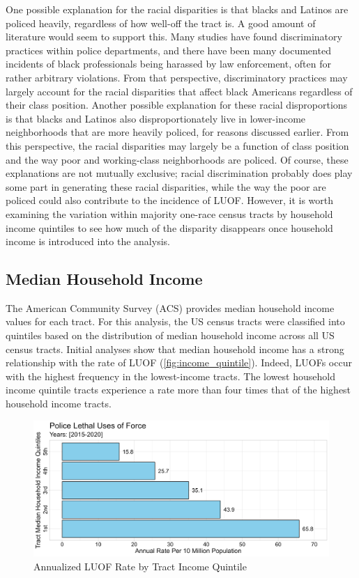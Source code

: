\documentclass[12pt]{article}
\begin{document}
One possible explanation for the racial disparities is that blacks and Latinos are policed heavily, regardless of how well-off the tract is. A good amount of literature would seem to support this. Many studies have found discriminatory practices within police departments, and there have been many documented incidents of black professionals being harassed by law enforcement, often for rather arbitrary violations. From that perspective, discriminatory practices may largely account for the racial disparities that affect black Americans regardless of their class position. Another possible explanation for these racial disproportions is that blacks and Latinos also disproportionately live in lower-income neighborhoods that are more heavily policed, for reasons discussed earlier. From this perspective, the racial disparities may largely be a function of class position and the way poor and working-class neighborhoods are policed. Of course, these explanations are not mutually exclusive; racial discrimination probably does play some part in generating these racial disparities, while the way the poor are policed could also contribute to the incidence of LUOF. However, it is worth examining the variation within majority one-race census tracts by household income quintiles to see how much of the disparity disappears once household income is introduced into the analysis.

\subsection{Median Household Income}

The American Community Survey (ACS) provides median household income values for each tract. For this analysis, the US census tracts were classified into quintiles based on the distribution of median household income across all US census tracts. Initial analyses show that median household income has a strong relationship with the rate of LUOF (\autoref{fig:income_quintile}). Indeed, LUOFs occur with the highest frequency in the lowest-income tracts. The lowest household income quintile tracts experience a rate more than four times that of the highest household income tracts.

\begin{figure}[H]
  \centering %
  \includegraphics[width=\linewidth]{images/income_quintiles_only_ind}
  \captionsetup{justification=centering, singlelinecheck=false, margin=2cm}
  \caption[Annualized LUOF Rate by Tract Income Quintile]{Annualized LUOF Rate by Tract Income Quintile}
  \label{fig:income_quintile}
\end{figure}
\end{document}
